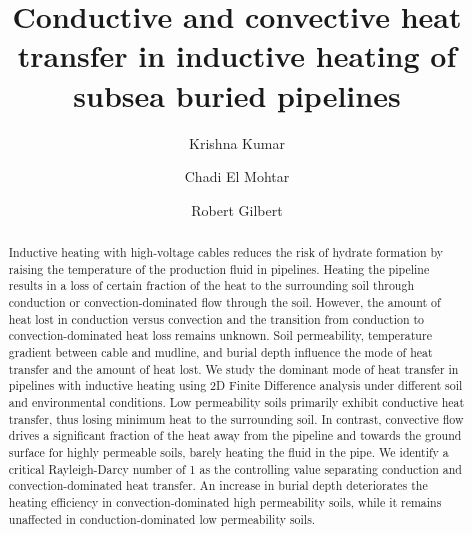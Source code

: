\documentclass[Journal,letterpaper,InsideFigs]{ascelike-new}
\begin{document}
\title{Conductive and convective heat transfer in inductive heating of subsea buried pipelines}

\author[1]{Krishna Kumar}
\author[2]{Chadi El Mohtar}
\author[2]{Robert Gilbert}


\maketitle

\begin{abstract}
Inductive heating with high-voltage cables reduces the risk of hydrate formation by raising the temperature of the production fluid in pipelines. Heating the pipeline results in a loss of certain fraction of the heat to the surrounding soil through conduction or convection-dominated flow through the soil. However, the amount of heat lost in conduction versus convection and the transition from conduction to convection-dominated heat loss remains unknown. Soil permeability, temperature gradient between cable and mudline, and burial depth influence the mode of heat transfer and the amount of heat lost. We study the dominant mode of heat transfer in pipelines with inductive heating using 2D Finite Difference analysis under different soil and environmental conditions. Low permeability soils primarily exhibit conductive heat transfer, thus losing minimum heat to the surrounding soil. In contrast, convective flow drives a significant fraction of the heat away from the pipeline and towards the ground surface for highly permeable soils, barely heating the fluid in the pipe.  We identify a critical Rayleigh-Darcy number of 1 as the controlling value separating conduction and convection-dominated heat transfer. An increase in burial depth deteriorates the heating efficiency in convection-dominated high permeability soils, while it remains unaffected in conduction-dominated low permeability soils.
\end{abstract}
\end{document}
